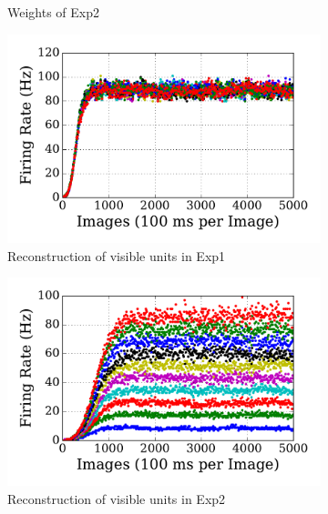 \begin{figure}
\begin{subfigure}[t]{0.48\textwidth}
		\caption{Weights of Exp2}
	\end{subfigure}
	\begin{subfigure}[t]{0.48\textwidth}
		\includegraphics[width=\textwidth]{pics_sdlm/07_exp_SAE_all_long/exp1_recon_s.pdf}
		\caption{Reconstruction of visible units in Exp1}
	\end{subfigure}
	\begin{subfigure}[t]{0.48\textwidth}
		\includegraphics[width=\textwidth]{pics_sdlm/07_exp_SAE_all_long/exp2_recon_s.pdf}
		\caption{Reconstruction of visible units in Exp2}
	\end{subfigure}\\
	\begin{subfigure}[t]{0.48\textwidth}

\end{subfigure}
\end{figure}
